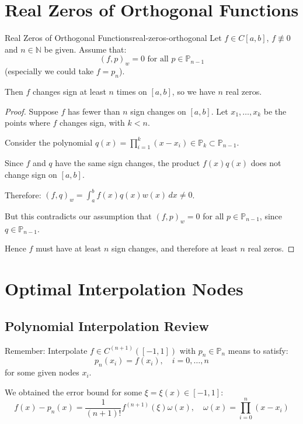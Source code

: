 \section{Real Zeros of Orthogonal Functions}

\begin{theorem}{Real Zeros of Orthogonal Functions}{real-zeros-orthogonal}
    Let $f \in C[a,b]$, $f \not\equiv 0$ and $n \in \mathbb{N}$ be given. Assume that:
    \[(f, p)_w = 0 \text{ for all } p \in \mathbb{P}_{n-1}\]
    (especially we could take $f = p_n$).

    Then $f$ changes sign at least $n$ times on $[a,b]$, so we have $n$ real zeros.
\end{theorem}

\begin{proof}
    Suppose $f$ has fewer than $n$ sign changes on $[a,b]$. Let $x_1, \ldots, x_k$ be the points where $f$ changes sign, with $k < n$.

    Consider the polynomial $q(x) = \prod_{i=1}^k (x - x_i) \in \mathbb{P}_k \subset \mathbb{P}_{n-1}$.

    Since $f$ and $q$ have the same sign changes, the product $f(x)q(x)$ does not change sign on $[a,b]$.

    Therefore: $(f, q)_w = \int_a^b f(x)q(x)w(x) \, dx \neq 0$.

    But this contradicts our assumption that $(f, p)_w = 0$ for all $p \in \mathbb{P}_{n-1}$, since $q \in \mathbb{P}_{n-1}$.

    Hence $f$ must have at least $n$ sign changes, and therefore at least $n$ real zeros.
\end{proof}

\section{Optimal Interpolation Nodes}

\subsection{Polynomial Interpolation Review}

Remember: Interpolate $f \in C^{(n+1)}([-1,1])$ with $p_n \in \mathbb{P}_n$ means to satisfy:
\[p_n(x_i) = f(x_i), \quad i = 0, \ldots, n\]
for some given nodes $x_i$.

We obtained the error bound for some $\xi = \xi(x) \in [-1,1]$:
\[f(x) - p_n(x) = \frac{1}{(n+1)!} f^{(n+1)}(\xi) \omega(x), \quad \omega(x) = \prod_{i=0}^n (x - x_i)\]

